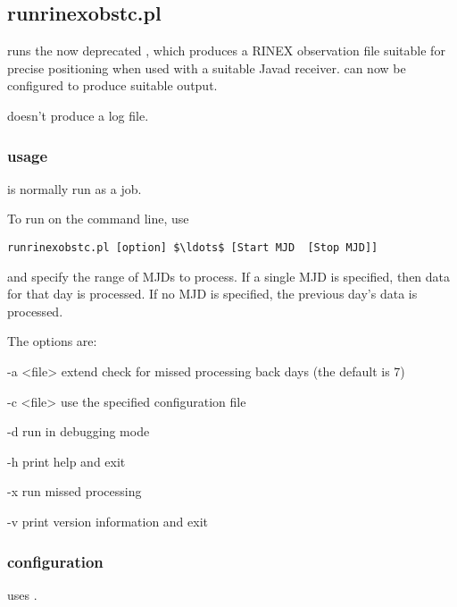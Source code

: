 \subsection{runrinexobstc.pl}

\hypertarget{h:runrinexobstc}{}

 runs the now deprecated , which produces a
RINEX observation file suitable for precise positioning when used with a 
suitable Javad receiver.  can now be configured to produce suitable output.

 doesn't produce a log file.
	
\subsubsection{usage}
 is normally run as a  job.

To run  on the command line, use
\begin{lstlisting}[mathescape=true]
runrinexobstc.pl [option] $\ldots$ [Start MJD  [Stop MJD]]
\end{lstlisting}

 and  specify the range of MJDs to process.
If a single MJD is specified, then data for that day is processed. If no
MJD is specified, the previous day's data is processed.

The options are:
\begin{description*}
	\item[-a \textless{file}\textgreater]  extend check for missed processing back  days 
		(the default is 7)
	\item[-c \textless{file}\textgreater] use the specified configuration file
	\item[-d]	run in debugging mode
	\item[-h]	print help and exit
	\item[-x] run missed processing
	\item[-v]	print version information and exit
\end{description*}

\subsubsection{configuration}

 uses . 

